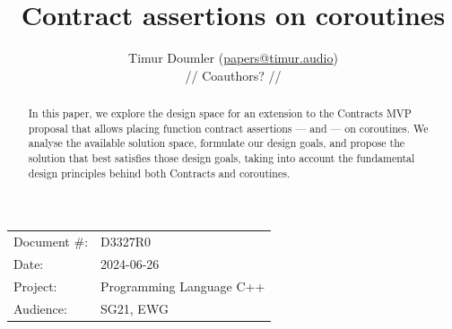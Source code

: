 

 \usepackage[bottom]{footmisc} 

 \usepackage{longtable}


\usepackage{tikz,lipsum,lmodern}
\usepackage[most]{tcolorbox}




\title{Contract assertions on coroutines}
\author{ Timur Doumler \small(\href{mailto:papers@timur.audio}{papers@timur.audio}) \\
// Coauthors? //
}
\date{}
\maketitle

\begin{tabular}{ll}
Document \#: & D3327R0 \\
Date: &2024-06-26 \\
Project: & Programming Language C++ \\
Audience: & SG21, EWG
\end{tabular}

\begin{abstract}
In this paper, we explore the design space for an extension to the Contracts MVP proposal \cite{P2900R8} that allows placing function contract assertions ---  and 
 --- on coroutines. We analyse the available solution space, formulate our design goals, and propose the solution that best satisfies those design goals, taking into account the fundamental design principles behind both Contracts and coroutines.
\end{abstract}






